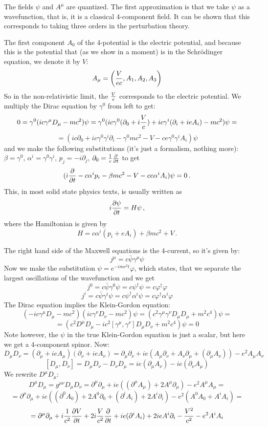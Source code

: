The fields $\psi$ and $A^\mu$ are quantized. The first approximation is that we
take $\psi$ as a wavefunction, that is, it is a classical 4-component field. It
can be shown that this corresponds to taking three orders in the perturbation
theory.

The first component $A_0$ of the 4-potential is the electric potential, and
because this is the potential that (as we show in a moment) is in the
Schr\"odinger equation, we denote it by $V$:
$$A_\mu=\left({V\over ec},A_1,A_2,A_3\right)$$
So in the non-relativistic limit, the $V\over e$ corresponds to the electric
potential.  We multiply the Dirac equation by $\gamma^0$ from left to get:
$$0=\gamma^0(ic\gamma^\mu D_\mu-mc^2)\psi=
\gamma^0(ic\gamma^0(\partial_0+i{V\over c})+ic\gamma^i
(\partial_i+ieA_i)-mc^2)\psi=$$
$$=
(ic\partial_0+ic\gamma^0\gamma^i\partial_i-\gamma^0mc^2-V
-ce\gamma^0\gamma^iA_i)\psi
$$
and we make the following substitutions (it's just a formalism, nothing more):
$\beta=\gamma^0$, $\alpha^i=\gamma^0\gamma^i$, $p_j=-i\partial_j$,
$\partial_0={1\over c}{\partial\over\partial t}$
to get
$$(i{\partial\over\partial t}-c\alpha^i p_i-\beta
mc^2-V-ce\alpha^iA_i)\psi=0\,.$$
This, in most solid state physics texts, is usually written as
$$ i{\partial\psi\over\partial t}=H\psi\,,$$
where the Hamiltonian is given by
$$ H=c\alpha^i(p_i+eA_i)+\beta mc^2+V\,.$$

The right hand side of the Maxwell equations is the 4-current, so it's given
by:
$$j^\mu=c\bar\psi\gamma^\mu\psi$$
Now we make the substitution $\psi=e^{-imc^2t}\varphi$, which states, that we
separate the largest oscillations of the wavefunction and we get
$$j^0=c\bar\psi\gamma^0\psi=c\psi^\dagger\psi=c\varphi^\dagger\varphi$$
$$j^i=c\bar\psi\gamma^i\psi=c\psi^\dagger\alpha^i\psi=c\varphi^\dagger\alpha^i\varphi$$
The Dirac equation implies the Klein-Gordon equation:
$$(-ic\gamma^\mu D_\mu-mc^2)(ic\gamma^\nu D_\nu-mc^2)\psi=
(c^2\gamma^\mu\gamma^\nu D_\mu D_\mu+m^2c^4)\psi=
$$
$$
=(c^2D^\mu D_\mu-ic^2[\gamma^\mu,\gamma^\nu]D_\mu D_\nu+m^2c^4)\psi=0$$
Note however, the $\psi$ in the true Klein-Gordon equation is just a scalar,
but here we get a 4-component spinor. Now:
$$
D_\mu D_\nu = (\partial_\mu+ieA_\mu)(\partial_\nu+ieA_\nu)=
\partial_\mu\partial_\nu+ie(A_\mu\partial_\nu+A_\nu\partial_\mu+
(\partial_\mu A_\nu))-e^2A_\mu A_\nu
$$
$$[D_\mu, D_\nu] = D_\mu D_\nu-D_\nu D_\mu=ie(\partial_\mu A_\nu)-
ie(\partial_\nu A_\mu)$$
We rewrite $D^\mu D_\mu$:
$$D^\mu D_\mu=g^{\mu\nu}D_\mu D_\nu=
\partial^\mu\partial_\mu+ie((\partial^\mu
A_\mu)+2A^\mu\partial_\mu) -e^2A^\mu A_\mu=$$
$$=\partial^\mu\partial_\mu+
ie((\partial^0 A_0)+2A^0\partial_0+(\partial^i A_i)+2A^i\partial_i)
-e^2(A^0A_0+A^i A_i)=$$
$$=\partial^\mu\partial_\mu
+i{1\over c^2}{\partial V\over\partial t}+
2i{V\over c^2}{\partial\over\partial t}
+ie(\partial^i A_i)+2ieA^i\partial_i
 -{V^2\over c^2}-e^2A^iA_i$$


